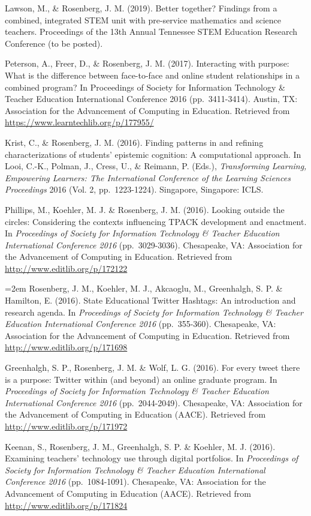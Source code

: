 \documentclass[]{article}
\begin{document}
Lawson, M., \& Rosenberg, J. M. (2019). Better together? Findings from a
combined, integrated STEM unit with pre-service mathematics and science
teachers. Proceedings of the 13th Annual Tennessee STEM Education
Research Conference (to be posted).

Peterson, A., Freer, D., \& Rosenberg, J. M. (2017). Interacting with
purpose: What is the difference between face-to-face and online student
relationships in a combined program? In Proceedings of Society for
Information Technology \& Teacher Education International Conference
2016 (pp.~3411-3414). Austin, TX: Association for the Advancement of
Computing in Education. Retrieved from
\url{https://www.learntechlib.org/p/177955/}

Krist, C., \& Rosenberg, J. M. (2016). Finding patterns in and refining
characterizations of students' epistemic cognition: A computational
approach. In Looi, C.-K., Polman, J., Cress, U., \& Reimann, P. (Eds.),
\emph{Transforming Learning, Empowering Learners: The International
Conference of the Learning Sciences Proceedings} 2016 (Vol. 2,
pp.~1223-1224). Singapore, Singapore: ICLS.

Phillips, M., Koehler, M. J. \& Rosenberg, J. M. (2016). Looking outside
the circles: Considering the contexts influencing TPACK development and
enactment. In \emph{Proceedings of Society for Information Technology \&
Teacher Education International Conference 2016} (pp.~3029-3036).
Chesapeake, VA: Association for the Advancement of Computing in
Education. Retrieved from \url{http://www.editlib.org/p/172122}

\hangindent=2em Rosenberg, J. M., Koehler, M. J., Akcaoglu, M.,
Greenhalgh, S. P. \& Hamilton, E. (2016). State Educational Twitter
Hashtags: An introduction and research agenda. In \emph{Proceedings of
Society for Information Technology \& Teacher Education International
Conference 2016} (pp.~355-360). Chesapeake, VA: Association for the
Advancement of Computing in Education. Retrieved from
\url{http://www.editlib.org/p/171698}

Greenhalgh, S. P., Rosenberg, J. M. \& Wolf, L. G. (2016). For every
tweet there is a purpose: Twitter within (and beyond) an online graduate
program. In \emph{Proceedings of Society for Information Technology \&
Teacher Education International Conference 2016} (pp.~2044-2049).
Chesapeake, VA: Association for the Advancement of Computing in
Education (AACE). Retrieved from \url{http://www.editlib.org/p/171972}

Keenan, S., Rosenberg, J. M., Greenhalgh, S. P. \& Koehler, M. J.
(2016). Examining teachers' technology use through digital portfolios.
In \emph{Proceedings of Society for Information Technology \& Teacher
Education International Conference 2016} (pp.~1084-1091). Chesapeake,
VA: Association for the Advancement of Computing in Education (AACE).
Retrieved from \url{http://www.editlib.org/p/171824}
\end{document}
